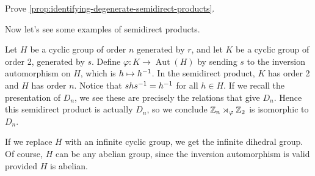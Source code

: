 \documentclass[./main.tex]{subfiles}
\begin{document}
\begin{exercise}
\label{ex:prop:identifying-degenerate-semidirect-products}
    Prove \cref{prop:identifying-degenerate-semidirect-products}.
\end{exercise}

Now let's see some examples of semidirect products. 

\begin{example}
    Let $H$ be a cyclic group of order $n$ generated by $r$, and let $K$ be a
    cyclic group of order 2, generated by $s$. Define $\varphi: K \to
    \operatorname{Aut}(H)$ by sending $s$ to the inversion automorphism on $H$,
    which is $h \mapsto h^{-1}$. In the semidirect product, $K$ has order 2 and
    $H$ has order $n$. Notice that $shs^{-1} = h^{-1}$ for all $h \in H$. If we
    recall the presentation of $D_n$, we see these are precisely the relations
    that give $D_n$. Hence this semidirect product is actually $D_n$, so we
    conclude $\mathbb{Z}_n \rtimes_\varphi \mathbb{Z}_2$ is isomorphic to $D_n$.
\end{example}
If we replace $H$ with an infinite cyclic group, we get the infinite dihedral
group. Of course, $H$ can be any abelian group, since the inversion automorphism
is valid provided $H$ is abelian. 
\end{document}
